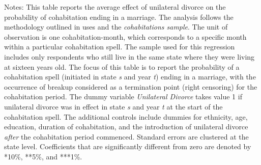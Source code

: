 \begin{table}[H]\centering                                  \scriptsize                                 \caption{The average effect of unilateral divorce on the probability that a cohabitation spell ends in a marriage. Unit of observation: cohabitation-month. Sample of never movers}                                   \label{tab:tabdurmk}                                 
\begin{minipage}{\textwidth}
\scriptsize\smallskip
Notes: This table reports the average effect of unilateral divorce on the probability of cohabitation ending in a marriage. The analysis follows the methodology outlined in \cite{borusyak2021} uses and the \textit{cohabitations sample}. The unit of observation is one cohabitation-month, which corresponds to a specific month within a particular cohabitation spell.  The sample used for this regression includes only respondents who still live in the same state where they were living at sixteen years old. The focus of this table is to report the probability of a cohabitation spell (initiated in state \textit{s} and year \textit{t}) ending in a marriage, with the occurrence of breakup considered as a termination point (right censoring) for the cohabitation period. The dummy variable \textit{Unilateral Divorce} takes value 1 if unilateral divorce was in effect in state \textit{s} and year \textit{t} at the start of the cohabitation spell. The additional controls include dummies for ethnicity, age, education, duration of cohabitation, and the introduction of unilateral divorce \textit{after} the cohabitation period commenced. Standard errors are clustered at the state level. Coefficients that are significantly different from zero are denoted by *10\%, **5\%, and ***1\%.
\\
\end{minipage}
\end{table}
